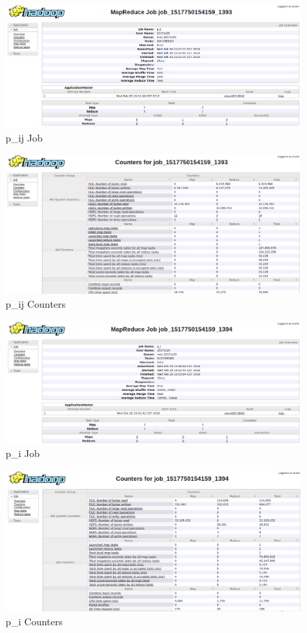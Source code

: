 \documentclass[a4paper,UTF8]{article}
\theoremstyle{definition}
\begin{document}
\begin{figure}[H]
	\centering
	\includegraphics[width=\textwidth]{pic/393_p_ij_job.png}
	\caption{p\_ij Job}
\end{figure}
\begin{figure}[H]
	\centering
	\includegraphics[width=\textwidth]{pic/393_p_ij_counters.png}
	\caption{p\_ij Counters}
\end{figure}

\begin{figure}[H]
	\centering
	\includegraphics[width=\textwidth]{pic/394_p_i_job.png}
	\caption{p\_i Job}
\end{figure}
\begin{figure}[H]
	\centering
	\includegraphics[width=\textwidth]{pic/394_p_i_counters.png}
	\caption{p\_i Counters}
\end{figure}
\end{document}
